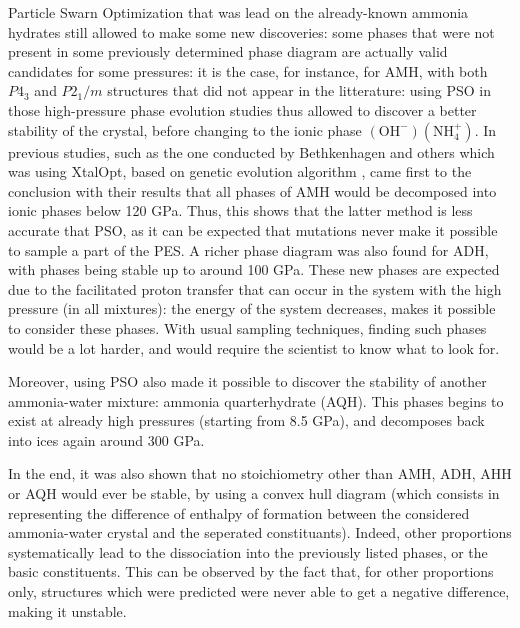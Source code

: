\documentclass[11pt]{article}
\begin{document}
\begin{multicols}{2}
Particle Swarn Optimization that was lead on the already-known ammonia hydrates still allowed to make some new discoveries: some phases that were not present in some previously determined phase diagram are actually valid candidates for some pressures: it is the case, for instance, for AMH, with both $P4_3$ and $P2_1/m$ structures that did not appear in the litterature: using PSO in those high-pressure phase evolution studies thus allowed to discover a better stability of the crystal, before changing to the ionic phase $(\mathrm{OH}^-)(\mathrm{NH}_4^+)$. In previous studies, such as the one conducted by Bethkenhagen and others which was using XtalOpt, based on genetic evolution algorithm \cite{doi:10.1021/acs.jpca.5b07854}, came first to the conclusion with their results that all phases of AMH would be decomposed into ionic phases below 120 GPa. Thus, this shows that the latter method is less accurate that PSO, as it can be expected that mutations never make it possible to sample a part of the PES. A richer phase diagram was also found for ADH, with phases being stable up to around 100 GPa. These new phases are expected due to the facilitated proton transfer that can occur in the system with the high pressure (in all mixtures): the energy of the system decreases, makes it possible to consider these phases. With usual sampling techniques, finding such phases would be a lot harder, and would require the scientist to know what to look for.\vspace{1em}

Moreover, using PSO also made it possible to discover the stability of another ammonia-water mixture: ammonia quarterhydrate (AQH). This phases begins to exist at already high pressures (starting from 8.5 GPa), and decomposes back into ices again around 300 GPa.\vspace{1em}

In the end, it was also shown that no stoichiometry other than AMH, ADH, AHH or AQH would ever be stable, by using a convex hull diagram (which consists in representing the difference of enthalpy of formation between the considered ammonia-water crystal and the seperated constituants). Indeed, other proportions systematically lead to the dissociation into the previously listed phases, or the basic constituents. This can be observed by the fact that, for other proportions only, structures which were predicted were never able to get a negative difference, making it unstable. 

\end{multicols}
\end{document}
